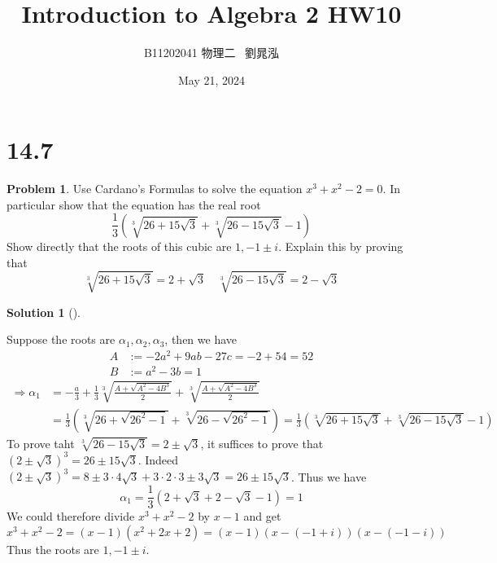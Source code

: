 \documentclass{article}
\title{Introduction to Algebra 2 HW10}
\author{B11202041 物理二 \, 劉晁泓}
\date{May 21, 2024}
\theoremstyle{definition}
\newtheorem{prob}{Problem}
\newtheorem*{sol}{Solution}
\newenvironment{sols}[1][]{%
  \begin{sol}[#1]$ $\par\nobreak\ignorespaces
}{%
  \end{sol}
}
\newcommand{\Ra}{\Rightarrow}
\begin{document}
\maketitle
\thispagestyle{fancy}
\renewcommand{\footrulewidth}{0.4pt}
\cfoot{\thepage}
\renewcommand{\headrulewidth}{0.4pt}

\section*{14.7}

\setcounter{prob}{0}
\begin{prob}
	Use Cardano's Formulas to solve the equation $x^3 + x^2 - 2 = 0$.
	In particular show that the equation has the real root
	\[
		\frac{1}{3} \left( \sqrt[3]{26 + 15 \sqrt{3}} + \sqrt[3]{26 - 15 \sqrt{3}} - 1 \right)
	\]
	Show directly that the roots of this cubic are $1, -1 \pm i$.
	Explain this by proving that 
	\[
		\sqrt[3]{26 + 15 \sqrt{3}} = 2 + \sqrt{3} \quad \sqrt[3]{26 - 15 \sqrt{3}} = 2 - \sqrt{3}
	\]
\end{prob}

\begin{sols}
	Suppose the roots are $\alpha_1, \alpha_2, \alpha_3$, then we have
	\[
		\begin{split}
			A &:= -2 a^2 + 9 ab - 27 c = -2 + 54 = 52\\
			B &:= a^2 - 3b = 1
		\end{split}
	\]
	\[
		\begin{split}
			\Ra \alpha_1 &= -\frac{a}{3} + \frac{1}{3} \sqrt[3]{\frac{A + \sqrt{A^2 - 4 B^3}}{2}} + \sqrt[3]{\frac{A + \sqrt{A^2 - 4 B^3}}{2}} \\
			&= \frac{1}{3} \left(\sqrt[3]{26 + \sqrt{26^2 - 1}} + \sqrt[3]{26 - \sqrt{26^2 - 1}} \right) =\frac{1}{3} \left( \sqrt[3]{26 + 15 \sqrt{3}} + \sqrt[3]{26 - 15 \sqrt{3}} - 1 \right)
		\end{split}
	\]
	To prove taht $\sqrt[3]{26 - 15 \sqrt{3}} = 2 \pm \sqrt{3}$, it suffices to prove that $(2 \pm \sqrt{3})^3 = 26 \pm 15 \sqrt{3}$.
	Indeed $(2 \pm \sqrt{3})^3 = 8 \pm 3 \cdot 4 \sqrt{3} + 3 \cdot 2 \cdot 3 \pm 3 \sqrt{3} = 26 \pm 15 \sqrt{3}$.
	Thus we have
	\[
		\alpha_1 = \frac{1}{3} (2 + \sqrt{3} + 2 - \sqrt{3} - 1) = 1
	\]
	We could therefore divide $x^3 + x^2 - 2$ by $x - 1$ and get
	\[
		x^3 + x^2 - 2 = (x - 1)(x^2 + 2x + 2) = (x - 1) (x - (-1 + i)) (x - (-1 - i))
	\]
	Thus the roots are $1, -1 \pm i$.

\end{sols}
\end{document}
